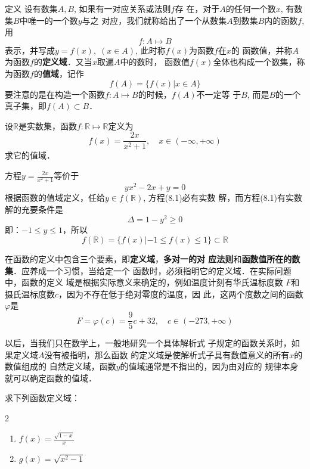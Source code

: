 \begin{blk}{定义}
     设有数集$A,B$, 如果有一对应关系或法则$f$存
在，对于$A$的任何一个数$x$, 有数集$B$中唯一的一个数$y$与之
对应，我们就称给出了一个从数集$A$到数集$B$内的函数$f$, 用
\[f:A\mapsto B\]
表示，并写成$y=f(x),\; (x\in A)$, 此时称$f(x)$为函数$f$在$x$的
函数值，并称$A$为函数$f$的\textbf{定义域}．又当$x$取遍$A$中的数时，
函数值$f(x)$全体也构成一个数集，称为函数$f$的\textbf{值域}，记作
\[f(A)=\{f(x)|x\in A\}\]
要注意的是在构造一个函数$f:A\mapsto B$的时候，$f(A)$不一定等
于$B$, 而是$B$的一个真子集，即$f(A)\subset B$．
\end{blk}



\begin{example}
设$\mathbb{R}$是实数集，函数$f:\mathbb{R}\mapsto\mathbb{R}$定义为
\[f(x)=\frac{2x}{x^2+1},\quad x\in(-\infty,+\infty)\]
求它的值域．
\end{example}

\begin{solution}
    方程$y=\frac{2x}{x^2+1}$等价于
    \begin{equation}
        yx^2-2x+y=0
    \end{equation}
根据函数的值域定义，任给$y\in f(\mathbb{R})$, 方程(8.1)必有实数
解，而方程(8.1)有实数解的充要条件是
\[\Delta=1-y^2\ge 0\]
即：$-1\le y\le 1$，所以
\[f(\mathbb{R})=\{f(x)|-1\le f(x)\le 1\}\subset \mathbb{R}\]
\end{solution}

在函数的定义中包含三个要素，即\textbf{定义域}，\textbf{多对一的对
应法则}和\textbf{函数值所在的数集}．应养成一个习惯，当给定一个
函数时，必须指明它的定义域．在实际问题中，函数的定义
域是根据实际意义来确定的，例如温度计刻有华氏温标度数
$F$和摄氏温标度数$c$，因为不存在低于绝对零度的温度，因
此，这两个度数之间的函数$\varphi$是
\[F=\varphi(c)=\frac{9}{5}c+32,\quad c\in (-273,+\infty)\]

以后，当我们只在数学上，一般地研究一个具体解析式
子规定的函数关系时，如果定义域$A$没有被指明，那么函数
的定义域是使解析式子具有数值意义的所有$x$的数值组成的
自然定义域，函数$y$的值域通常是不指出的，因为由对应的
规律本身就可以确定函数的值域．


\begin{example}
    求下列函数定义域：
\begin{multicols}{2}
\begin{enumerate}
    \item $f(x)=\frac{\sqrt{1-x}}{x}$
    \item $g(x)=\sqrt{x^2-1}$
\end{enumerate}
\end{multicols}
\end{example}

